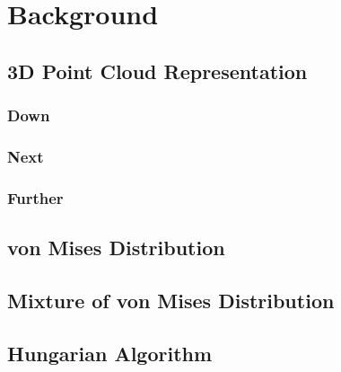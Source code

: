 \chapter{Background}




\section{3D Point Cloud Representation}

\subsection{Down}


\subsection{Next}



\subsection{Further}

\section{von Mises Distribution}
\section{Mixture of von Mises Distribution}
\section{Hungarian Algorithm}


